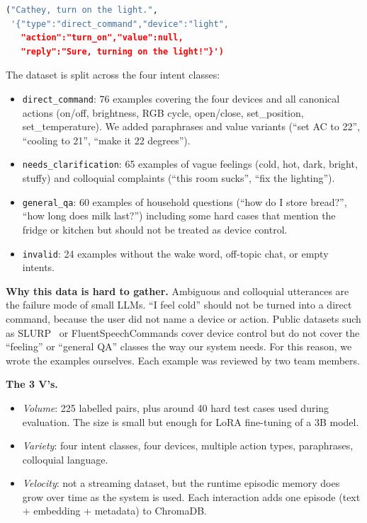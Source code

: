 \documentclass[conference]{IEEEtran}
\begin{document}
\begin{lstlisting}[language=Python]
("Cathey, turn on the light.",
 '{"type":"direct_command","device":"light",
   "action":"turn_on","value":null,
   "reply":"Sure, turning on the light!"}')
\end{lstlisting}

The dataset is split across the four intent classes:
\begin{itemize}
    \item \texttt{direct\_command}: 76 examples covering the four devices and all canonical actions (on/off, brightness, RGB cycle, open/close, set\_position, set\_temperature). We added paraphrases and value variants (``set AC to 22'', ``cooling to 21'', ``make it 22 degrees'').
    \item \texttt{needs\_clarification}: 65 examples of vague feelings (cold, hot, dark, bright, stuffy) and colloquial complaints (``this room sucks'', ``fix the lighting'').
    \item \texttt{general\_qa}: 60 examples of household questions (``how do I store bread?'', ``how long does milk last?'') including some hard cases that mention the fridge or kitchen but should not be treated as device control.
    \item \texttt{invalid}: 24 examples without the wake word, off-topic chat, or empty intents.
\end{itemize}

\textbf{Why this data is hard to gather.} Ambiguous and colloquial utterances are the failure mode of small LLMs. ``I feel cold'' should not be turned into a direct command, because the user did not name a device or action. Public datasets such as SLURP~\cite{bastianelli2020slurp} or FluentSpeechCommands cover device control but do not cover the ``feeling'' or ``general QA'' classes the way our system needs. For this reason, we wrote the examples ourselves. Each example was reviewed by two team members.

\textbf{The 3 V's.}
\begin{itemize}
    \item \emph{Volume}: 225 labelled pairs, plus around 40 hard test cases used during evaluation. The size is small but enough for LoRA fine-tuning of a 3B model.
    \item \emph{Variety}: four intent classes, four devices, multiple action types, paraphrases, colloquial language.
    \item \emph{Velocity}: not a streaming dataset, but the runtime episodic memory does grow over time as the system is used. Each interaction adds one episode (text + embedding + metadata) to ChromaDB.
\end{itemize}
\end{document}
